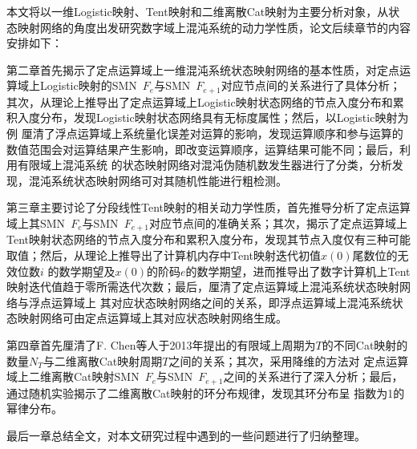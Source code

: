 本文将以一维Logistic映射、Tent映射和二维离散Cat映射为主要分析对象，从状态映射网络的角度出发研究数字域上混沌系统的动力学性质，论文后续章节的内容安排如下：

第二章首先揭示了定点运算域上一维混沌系统状态映射网络的基本性质，对定点运算域上Logistic映射的SMN\ $F_e$与SMN\ $F_{e+1}$对应节点间的关系进行了具体分析；
其次，从理论上推导出了定点运算域上Logistic映射状态网络的节点入度分布和累积入度分布，发现Logistic映射状态网络具有无标度属性；然后，以Logistic映射为例
厘清了浮点运算域上系统量化误差对运算的影响，发现运算顺序和参与运算的数值范围会对运算结果产生影响，即改变运算顺序，运算结果可能不同；最后，利用有限域上混沌系统
的状态映射网络对混沌伪随机数发生器进行了分类，分析发现，混沌系统状态映射网络可对其随机性能进行粗检测。

第三章主要讨论了分段线性Tent映射的相关动力学性质，首先推导分析了定点运算域上其SMN\ $F_e$与SMN\ $F_{e+1}$对应节点间的准确关系；其次，揭示了定点运算域上
Tent映射状态网络的节点入度分布和累积入度分布，发现其节点入度仅有三种可能取值；然后，从理论上推导出了计算机内存中Tent映射迭代初值$x(0)$尾数位的无效位数$i$
的数学期望及$x(0)$的阶码$e$的数学期望，进而推导出了数字计算机上Tent映射迭代值趋于零所需迭代次数；最后，厘清了定点运算域上混沌系统状态映射网络与浮点运算域上
其对应状态映射网络之间的关系，即浮点运算域上混沌系统状态映射网络可由定点运算域上其对应状态映射网络生成。

第四章首先厘清了F. Chen等人于2013年提出的有限域上周期为$T$的不同Cat映射的数量$N_T$与二维离散Cat映射周期$T$之间的关系；其次，采用降维的方法对
定点运算域上二维离散Cat映射SMN\ $F_e$与SMN\ $F_{e+1}$之间的关系进行了深入分析；最后，通过随机实验揭示了二维离散Cat映射的环分布规律，发现其环分布呈
指数为1的幂律分布。

最后一章总结全文，对本文研究过程中遇到的一些问题进行了归纳整理。